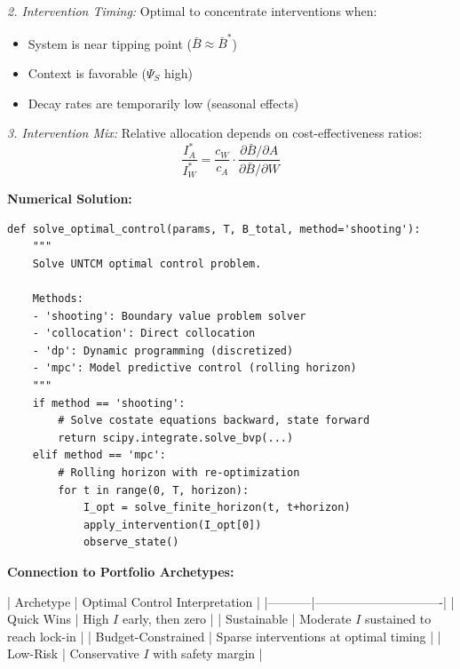 \begin{tcolorbox}[colback=red!5!white, colframe=red!75!black,
    title=\textbf{Method UNTCM-M4: Optimal Control Framework}]
\textit{2. Intervention Timing:}
Optimal to concentrate interventions when:
\begin{itemize}[nosep]
\item System is near tipping point ($\bar{B} \approx \bar{B}^*$)
\item Context is favorable ($\Psi_S$ high)
\item Decay rates are temporarily low (seasonal effects)
\end{itemize}

\textit{3. Intervention Mix:}
Relative allocation depends on cost-effectiveness ratios:
\begin{equation}
\frac{I_A^*}{I_W^*} = \frac{c_W}{c_A} \cdot \frac{\partial \bar{B}/\partial A}{\partial \bar{B}/\partial W}
\end{equation}

\textbf{Numerical Solution:}

\begin{verbatim}
def solve_optimal_control(params, T, B_total, method='shooting'):
    """
    Solve UNTCM optimal control problem.

    Methods:
    - 'shooting': Boundary value problem solver
    - 'collocation': Direct collocation
    - 'dp': Dynamic programming (discretized)
    - 'mpc': Model predictive control (rolling horizon)
    """
    if method == 'shooting':
        # Solve costate equations backward, state forward
        return scipy.integrate.solve_bvp(...)
    elif method == 'mpc':
        # Rolling horizon with re-optimization
        for t in range(0, T, horizon):
            I_opt = solve_finite_horizon(t, t+horizon)
            apply_intervention(I_opt[0])
            observe_state()
\end{verbatim}

\textbf{Connection to Portfolio Archetypes:}

| Archetype | Optimal Control Interpretation |
|-----------|-------------------------------|
| Quick Wins | High $I$ early, then zero |
| Sustainable | Moderate $I$ sustained to reach lock-in |
| Budget-Constrained | Sparse interventions at optimal timing |
| Low-Risk | Conservative $I$ with safety margin |

\end{tcolorbox}


